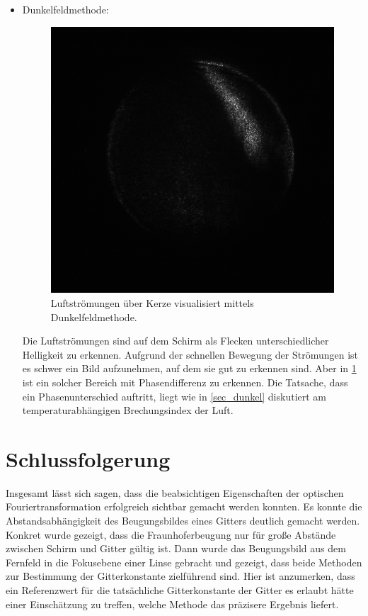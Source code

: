 \documentclass[
	a4paper,
	12pt,
	pagesize,
	ngerman
]{scrartcl}
\begin{document}
\begin{itemize}
	\item{Dunkelfeldmethode:}
	\begin{figure}[H]
			\includegraphics[width=0.6\linewidth]{raw/4/4_k_2}
			\caption{
				Luftströmungen über Kerze visualisiert mittels Dunkelfeldmethode.
			}
			\label{fig_air}
	\end{figure}
	Die Luftströmungen sind auf dem Schirm als Flecken unterschiedlicher Helligkeit zu erkennen.
	Aufgrund der schnellen Bewegung der Strömungen ist es schwer ein Bild aufzunehmen, auf dem sie gut zu erkennen sind.
	Aber in \cref{fig_air} ist ein solcher Bereich mit Phasendifferenz zu erkennen.
	Die Tatsache, dass ein Phasenunterschied auftritt, liegt wie in \cref{sec_dunkel} diskutiert am temperaturabhängigen Brechungsindex der Luft.
\end{itemize}



	\section{Schlussfolgerung}
	Insgesamt lässt sich sagen, dass die beabsichtigen Eigenschaften der optischen Fouriertransformation erfolgreich sichtbar gemacht werden konnten.
	Es konnte die Abstandsabhängigkeit des Beugungsbildes eines Gitters deutlich gemacht werden.
	Konkret wurde gezeigt, dass die Fraunhoferbeugung nur für große Abstände zwischen Schirm und Gitter gültig ist.
	Dann wurde das Beugungsbild aus dem Fernfeld in die Fokusebene einer Linse gebracht und gezeigt, dass beide Methoden zur Bestimmung der Gitterkonstante zielführend sind.
	Hier ist anzumerken, dass ein Referenzwert für die tatsächliche Gitterkonstante der Gitter es erlaubt hätte einer Einschätzung zu treffen, welche Methode das präzisere Ergebnis liefert.
\end{document}
